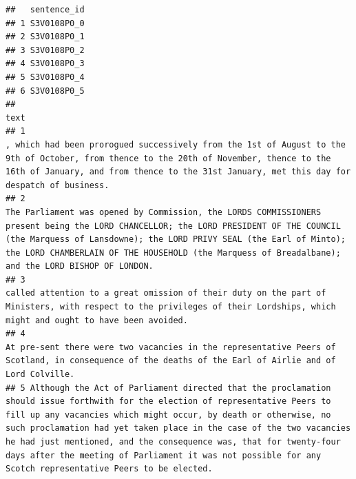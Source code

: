 \documentclass[
]{article}
\begin{document}
\begin{verbatim}
##   sentence_id
## 1 S3V0108P0_0
## 2 S3V0108P0_1
## 3 S3V0108P0_2
## 4 S3V0108P0_3
## 5 S3V0108P0_4
## 6 S3V0108P0_5
##                                                                                                                                                                                                                                                                                                                                                                                                                                                          text
## 1                                                                                                                                                                                                                       , which had been prorogued successively from the 1st of August to the 9th of October, from thence to the 20th of November, thence to the 16th of January, and from thence to the 31st January, met this day for despatch of business.
## 2                                                                                                                                             The Parliament was opened by Commission, the LORDS COMMISSIONERS present being the LORD CHANCELLOR; the LORD PRESIDENT OF THE COUNCIL (the Marquess of Lansdowne); the LORD PRIVY SEAL (the Earl of Minto); the LORD CHAMBERLAIN OF THE HOUSEHOLD (the Marquess of Breadalbane); and the LORD BISHOP OF LONDON.
## 3                                                                                                                                                                                                                                                                                 called attention to a great omission of their duty on the part of Ministers, with respect to the privileges of their Lordships, which might and ought to have been avoided.
## 4                                                                                                                                                                                                                                                                                                      At pre-sent there were two vacancies in the representative Peers of Scotland, in consequence of the deaths of the Earl of Airlie and of Lord Colville.
## 5 Although the Act of Parliament directed that the proclamation should issue forthwith for the election of representative Peers to fill up any vacancies which might occur, by death or otherwise, no such proclamation had yet taken place in the case of the two vacancies he had just mentioned, and the consequence was, that for twenty-four days after the meeting of Parliament it was not possible for any Scotch representative Peers to be elected.

\end{verbatim}
\end{document}
